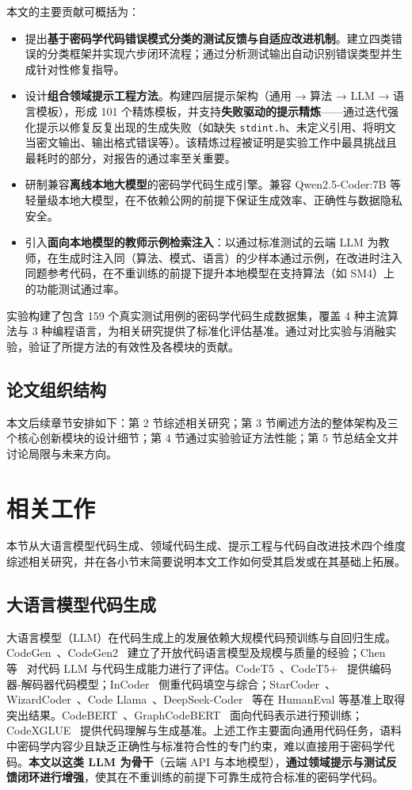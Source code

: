 \documentclass[12pt]{llncs}
\begin{document}
本文的主要贡献可概括为：
\begin{itemize}
    \item 提出\textbf{基于密码学代码错误模式分类的测试反馈与自适应改进机制}。建立四类错误的分类框架并实现六步闭环流程；通过分析测试输出自动识别错误类型并生成针对性修复指导。
    \item 设计\textbf{组合领域提示工程方法}。构建四层提示架构（通用 → 算法 → LLM → 语言模板），形成 101 个精炼模板，并支持\textbf{失败驱动的提示精炼}——通过迭代强化提示以修复反复出现的生成失败（如缺失 \texttt{stdint.h}、未定义引用、将明文当密文输出、输出格式错误等）。该精炼过程被证明是实验工作中最具挑战且最耗时的部分，对报告的通过率至关重要。
    \item 研制兼容\textbf{离线本地大模型}的密码学代码生成引擎。兼容 Qwen2.5-Coder:7B 等轻量级本地大模型，在不依赖公网的前提下保证生成效率、正确性与数据隐私安全。
    \item 引入\textbf{面向本地模型的教师示例检索注入}：以通过标准测试的云端 LLM 为教师，在生成时注入同（算法、模式、语言）的少样本通过示例，在改进时注入同题参考代码，在不重训练的前提下提升本地模型在支持算法（如 SM4）上的功能测试通过率。
\end{itemize}
实验构建了包含 159 个真实测试用例的密码学代码生成数据集，覆盖 4 种主流算法与 3 种编程语言，为相关研究提供了标准化评估基准。通过对比实验与消融实验，验证了所提方法的有效性及各模块的贡献。


\subsection{论文组织结构}
本文后续章节安排如下：第 2 节综述相关研究；第 3 节阐述方法的整体架构及三个核心创新模块的设计细节；第 4 节通过实验验证方法性能；第 5 节总结全文并讨论局限与未来方向。

\section{相关工作}
本节从大语言模型代码生成、领域代码生成、提示工程与代码自改进技术四个维度综述相关研究，并在各小节末简要说明本文工作如何受其启发或在其基础上拓展。

\subsection{大语言模型代码生成}
大语言模型（LLM）在代码生成上的发展依赖大规模代码预训练与自回归生成。CodeGen~\cite{codegen1}、CodeGen2~\cite{codegen2} 建立了开放代码语言模型及规模与质量的经验；Chen 等~\cite{codex} 对代码 LLM 与代码生成能力进行了评估。CodeT5~\cite{codet5}、CodeT5+~\cite{codet5plus} 提供编码器-解码器代码模型；InCoder~\cite{incoder} 侧重代码填空与综合；StarCoder~\cite{starcoder}、WizardCoder~\cite{wizardcoder}、Code Llama~\cite{codellama}、DeepSeek-Coder~\cite{deepseekcoder} 等在 HumanEval 等基准上取得突出结果。CodeBERT~\cite{codebert}、GraphCodeBERT~\cite{graphcodebert} 面向代码表示进行预训练；CodeXGLUE~\cite{codexglue} 提供代码理解与生成基准。上述工作主要面向通用代码任务，语料中密码学内容少且缺乏正确性与标准符合性的专门约束，难以直接用于密码学代码。\textbf{本文以这类 LLM 为骨干}（云端 API 与本地模型），\textbf{通过领域提示与测试反馈闭环进行增强}，使其在不重训练的前提下可靠生成符合标准的密码学代码。
\end{document}
